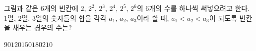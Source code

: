 \hspace*{2mm}\begin{minipage}[t]{\dimexpr\linewidth-2mm\relax}\vspace{0pt}
\noindent\begin{minipage}[t]{0.58\linewidth}\vspace{0pt}\raggedright 그림과 같은 $6$개의 빈칸에 $2$, $2^2$, $2^3$, $2^4$, $2^5$, $2^6$의 $6$개의 수를 하나씩 써넣으려고 한다. $1$열, $2$열, $3$열의 숫자들의 합을 각각 $a_1$, $a_2$, $a_3$이라 할 때, $a_1<a_2<a_3$이 되도록 빈칸을 채우는 경우의 수는?\end{minipage}\hfill\begin{minipage}[t]{0.4\linewidth}\vspace{0pt}\centering \resizebox{\ifdim\width>\linewidth\linewidth\else\width\fi}{!}{}\end{minipage}\par
\begin{choices32}{$90$}{$120$}{$150$}{$180$}{$210$}\end{choices32}\end{minipage}
